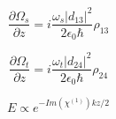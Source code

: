 \documentclass[aps,pra,showpacs,amsmath,amssymb,nofootinbib,longbibliography,superscriptaddress
]{revtex4-1}
\theoremstyle{definition}
\theoremstyle{remark}
\newcommand{\0}{\hat{0}}
\begin{document}
\begin{equation}
    \frac{\partial \Omega_s}{\partial z} = i \frac{\omega_s |d_{13}|^2}{2 \epsilon_0 \hbar} \rho_{13}
\end{equation}

\begin{equation}
    \frac{\partial \Omega_t}{\partial z} = i \frac{\omega_t |d_{24}|^2}{2 \epsilon_0 \hbar} \rho_{24}
\end{equation}


\begin{equation}\label{Beer}
    E \propto e^{-Im\left( \chi^{(1)} \right) k z / 2}
\end{equation}



\end{document}
